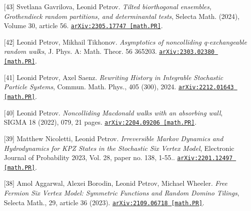 \begin{etaremune}
\item[{[43]}] 
Svetlana Gavrilova, Leonid Petrov.
\emph{Tilted biorthogonal ensembles, Grothendieck random partitions, and determinantal tests}, Selecta Math. (2024), Volume 30, article 56. 
\href{https://arxiv.org/abs/2305.17747}{\texttt{arXiv:2305.17747 [math.PR]}}.







\item[{[42]}] 
Leonid Petrov, Mikhail Tikhonov.
\emph{Asymptotics of noncolliding q-exchangeable random walks}, J. Phys. A: Math. Theor. 56 365203. 
\href{https://arxiv.org/abs/2303.02380}{\texttt{arXiv:2303.02380 [math.PR]}}.





\item[{[41]}] 
Leonid Petrov, Axel Saenz.
\emph{Rewriting History in Integrable Stochastic Particle Systems}, Commun. Math. Phys., 405 (300), 2024. 
\href{https://arxiv.org/abs/2212.01643}{\texttt{arXiv:2212.01643 [math.PR]}}.









\item[{[40]}] 
Leonid Petrov.
\emph{Noncolliding Macdonald walks with an absorbing wall}, SIGMA 18 (2022), 079, 21 pages. 
\href{https://arxiv.org/abs/2204.09206}{\texttt{arXiv:2204.09206 [math.PR]}}.



\item[{[39]}] 
Matthew Nicoletti, Leonid Petrov.
\emph{Irreversible Markov Dynamics and Hydrodynamics for KPZ States in the Stochastic Six Vertex Model}, Electronic Journal of Probability 2023, Vol. 28, paper no. 138, 1-55.. 
\href{https://arxiv.org/abs/2201.12497}{\texttt{arXiv:2201.12497 [math.PR]}}.











\item[{[38]}] 
Amol Aggarwal, Alexei Borodin, Leonid Petrov, Michael Wheeler.
\emph{Free Fermion Six Vertex Model: Symmetric Functions and Random Domino Tilings}, Selecta Math., 29, article 36 (2023). 
\href{https://arxiv.org/abs/2109.06718}{\texttt{arXiv:2109.06718 [math.PR]}}.


















\end{etaremune}
